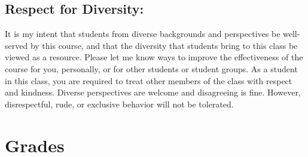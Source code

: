 \documentclass{tufte-handout}
\begin{document}
\begin{fullwidth}
\subsection{Respect for Diversity: } 

It is my intent that students from diverse backgrounds and perspectives be well-served by this course, and that the diversity that students bring to this class be viewed as a resource. Please let me know ways to improve the effectiveness of the course for you, personally, or for other students or student groups. As a student in this class, you are required to treat other members of the class with respect and kindness. Diverse perspectives are welcome and disagreeing is fine. However, disrespectful, rude, or exclusive behavior will not be tolerated.





\end{fullwidth}

\section{Grades}
\end{document}
